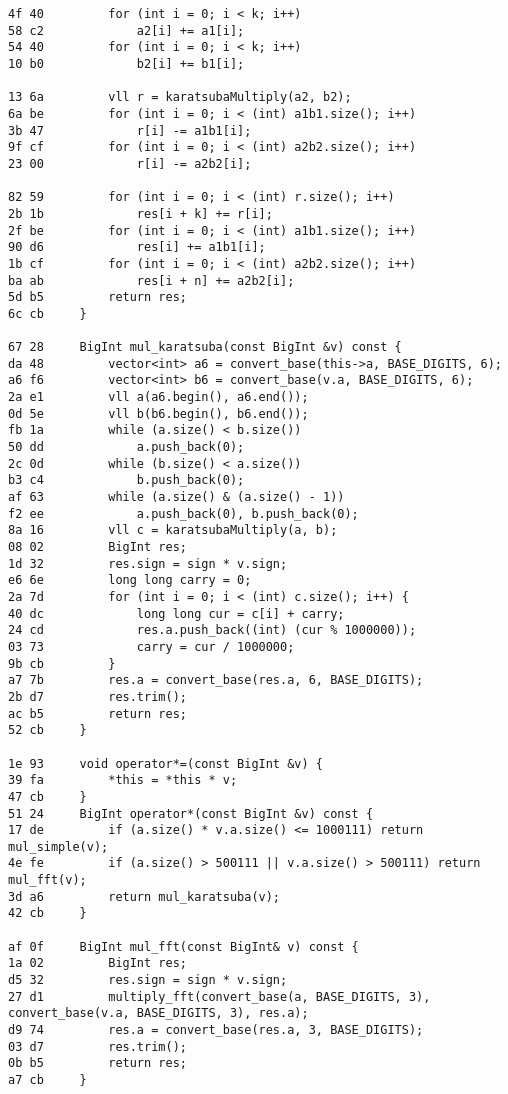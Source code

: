\documentclass[11pt, a4paper, twoside]{article}
\begin{document}
\begin{lstlisting}
4f 40         for (int i = 0; i < k; i++)
58 c2             a2[i] += a1[i];
54 40         for (int i = 0; i < k; i++)
10 b0             b2[i] += b1[i];
      
13 6a         vll r = karatsubaMultiply(a2, b2);
6a be         for (int i = 0; i < (int) a1b1.size(); i++)
3b 47             r[i] -= a1b1[i];
9f cf         for (int i = 0; i < (int) a2b2.size(); i++)
23 00             r[i] -= a2b2[i];
      
82 59         for (int i = 0; i < (int) r.size(); i++)
2b 1b             res[i + k] += r[i];
2f be         for (int i = 0; i < (int) a1b1.size(); i++)
90 d6             res[i] += a1b1[i];
1b cf         for (int i = 0; i < (int) a2b2.size(); i++)
ba ab             res[i + n] += a2b2[i];
5d b5         return res;
6c cb     }
      
67 28     BigInt mul_karatsuba(const BigInt &v) const {
da 48         vector<int> a6 = convert_base(this->a, BASE_DIGITS, 6);
a6 f6         vector<int> b6 = convert_base(v.a, BASE_DIGITS, 6);
2a e1         vll a(a6.begin(), a6.end());
0d 5e         vll b(b6.begin(), b6.end());
fb 1a         while (a.size() < b.size())
50 dd             a.push_back(0);
2c 0d         while (b.size() < a.size())
b3 c4             b.push_back(0);
af 63         while (a.size() & (a.size() - 1))
f2 ee             a.push_back(0), b.push_back(0);
8a 16         vll c = karatsubaMultiply(a, b);
08 02         BigInt res;
1d 32         res.sign = sign * v.sign;
e6 6e         long long carry = 0;
2a 7d         for (int i = 0; i < (int) c.size(); i++) {
40 dc             long long cur = c[i] + carry;
24 cd             res.a.push_back((int) (cur % 1000000));
03 73             carry = cur / 1000000;
9b cb         }
a7 7b         res.a = convert_base(res.a, 6, BASE_DIGITS);
2b d7         res.trim();
ac b5         return res;
52 cb     }
      
1e 93     void operator*=(const BigInt &v) {
39 fa         *this = *this * v;
47 cb     }
51 24     BigInt operator*(const BigInt &v) const {
17 de         if (a.size() * v.a.size() <= 1000111) return mul_simple(v);
4e fe         if (a.size() > 500111 || v.a.size() > 500111) return mul_fft(v);
3d a6         return mul_karatsuba(v);
42 cb     }
      
af 0f     BigInt mul_fft(const BigInt& v) const {
1a 02         BigInt res;
d5 32         res.sign = sign * v.sign;
27 d1         multiply_fft(convert_base(a, BASE_DIGITS, 3), convert_base(v.a, BASE_DIGITS, 3), res.a);
d9 74         res.a = convert_base(res.a, 3, BASE_DIGITS);
03 d7         res.trim();
0b b5         return res;
a7 cb     }
      

\end{lstlisting}
\end{document}

